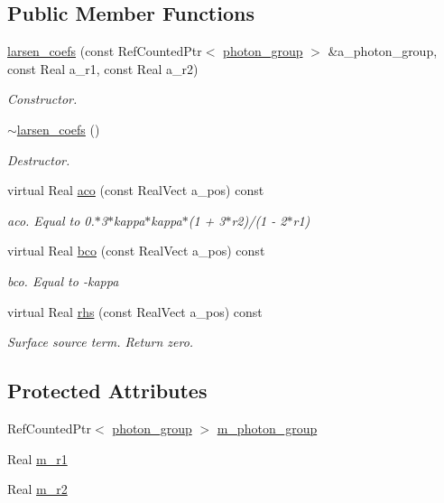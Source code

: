 \subsection*{Public Member Functions}
\begin{DoxyCompactItemize}
\item 
\hyperlink{classlarsen__coefs_a5874fbd8e58313686e30a92656abd56d}{larsen\+\_\+coefs} (const Ref\+Counted\+Ptr$<$ \hyperlink{classphoton__group}{photon\+\_\+group} $>$ \&a\+\_\+photon\+\_\+group, const Real a\+\_\+r1, const Real a\+\_\+r2)
\begin{DoxyCompactList}\small\item\em Constructor. \end{DoxyCompactList}\item 
\hyperlink{classlarsen__coefs_a10c0d53ea7426e5afcd62a06c48c8c67}{$\sim$larsen\+\_\+coefs} ()
\begin{DoxyCompactList}\small\item\em Destructor. \end{DoxyCompactList}\item 
virtual Real \hyperlink{classlarsen__coefs_a35095b0563cc502bc0918f8038bc9200}{aco} (const Real\+Vect a\+\_\+pos) const 
\begin{DoxyCompactList}\small\item\em aco. Equal to 0.$\ast$3$\ast$kappa$\ast$kappa$\ast$(1 + 3$\ast$r2)/(1 -\/ 2$\ast$r1) \end{DoxyCompactList}\item 
virtual Real \hyperlink{classlarsen__coefs_a659244c51aac28ff1ac08fa4e3079b32}{bco} (const Real\+Vect a\+\_\+pos) const 
\begin{DoxyCompactList}\small\item\em bco. Equal to -\/kappa \end{DoxyCompactList}\item 
virtual Real \hyperlink{classlarsen__coefs_a7976331f3f90664ed7a4b522894f1d08}{rhs} (const Real\+Vect a\+\_\+pos) const 
\begin{DoxyCompactList}\small\item\em Surface source term. Return zero. \end{DoxyCompactList}\end{DoxyCompactItemize}
\subsection*{Protected Attributes}
\begin{DoxyCompactItemize}
\item 
Ref\+Counted\+Ptr$<$ \hyperlink{classphoton__group}{photon\+\_\+group} $>$ \hyperlink{classlarsen__coefs_a11303e097f21193469950443e9503702}{m\+\_\+photon\+\_\+group}
\item 
Real \hyperlink{classlarsen__coefs_a4fb7d88061de16fd8e62eca52d9575ed}{m\+\_\+r1}
\item 
Real \hyperlink{classlarsen__coefs_af298f1540fa42112562e7005ac8c7553}{m\+\_\+r2}
\end{DoxyCompactItemize}


